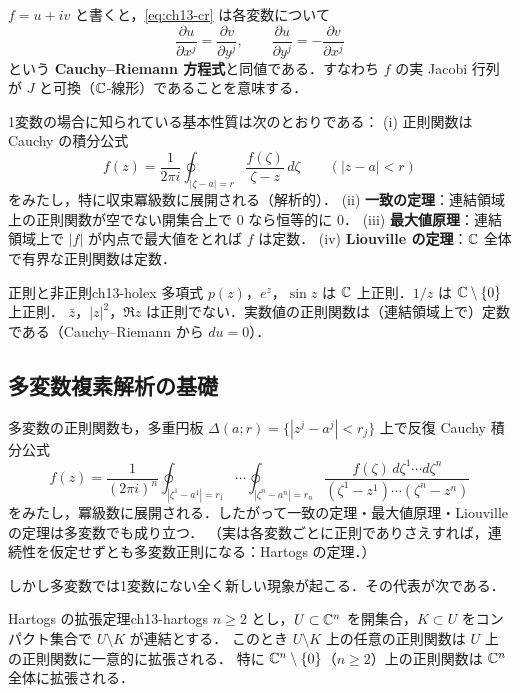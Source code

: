$f=u+iv$ と書くと，\eqref{eq:ch13-cr} は各変数について
\begin{equation}
  \frac{\partial u}{\partial x^j}=\frac{\partial v}{\partial y^j},\qquad
  \frac{\partial u}{\partial y^j}=-\frac{\partial v}{\partial x^j}
\end{equation}
という \textbf{Cauchy--Riemann 方程式}と同値である．すなわち $f$ の実 Jacobi 行列が $J$ と可換（$\mathbb{C}$-線形）であることを意味する．

1変数の場合に知られている基本性質は次のとおりである：
(i) 正則関数は Cauchy の積分公式
\begin{equation}
  f(z) = \frac{1}{2\pi i}\oint_{|\zeta-a|=r}\frac{f(\zeta)}{\zeta - z}\,d\zeta\qquad(|z-a|<r)
\end{equation}
をみたし，特に収束冪級数に展開される（解析的）．
(ii) \textbf{一致の定理}：連結領域上の正則関数が空でない開集合上で $0$ なら恒等的に $0$．
(iii) \textbf{最大値原理}：連結領域上で $|f|$ が内点で最大値をとれば $f$ は定数．
(iv) \textbf{Liouville の定理}：$\mathbb{C}$ 全体で有界な正則関数は定数．

\begin{myex}{正則と非正則}{ch13-holex}
多項式 $p(z)$，$e^z$，$\sin z$ は $\mathbb{C}$ 上正則．$1/z$ は $\mathbb{C}\setminus\{0\}$ 上正則．
$\bar z$，$|z|^2$，$\Re z$ は正則でない．実数値の正則関数は（連結領域上で）定数である（Cauchy--Riemann から $du=0$）．
\end{myex}

\subsection{多変数複素解析の基礎}

多変数の正則関数も，多重円板 $\Delta(a;r)=\{|z^j-a^j|<r_j\}$ 上で反復 Cauchy 積分公式
\begin{equation}
  f(z) = \frac{1}{(2\pi i)^n}\oint_{|\zeta^1-a^1|=r_1}\!\!\cdots\oint_{|\zeta^n-a^n|=r_n}
  \frac{f(\zeta)\,d\zeta^1\cdots d\zeta^n}{(\zeta^1-z^1)\cdots(\zeta^n-z^n)}
\end{equation}
をみたし，冪級数に展開される．したがって一致の定理・最大値原理・Liouville の定理は多変数でも成り立つ．
（実は各変数ごとに正則でありさえすれば，連続性を仮定せずとも多変数正則になる：Hartogs の定理．）

しかし多変数では1変数にない全く新しい現象が起こる．その代表が次である．

\begin{mythm}{Hartogs の拡張定理}{ch13-hartogs}
$n\geq2$ とし，$U\subset\mathbb{C}^n$ を開集合，$K\subset U$ をコンパクト集合で $U\setminus K$ が連結とする．
このとき $U\setminus K$ 上の任意の正則関数は $U$ 上の正則関数に一意的に拡張される．
特に $\mathbb{C}^n\setminus\{0\}$（$n\geq 2$）上の正則関数は $\mathbb{C}^n$ 全体に拡張される．
\end{mythm}

